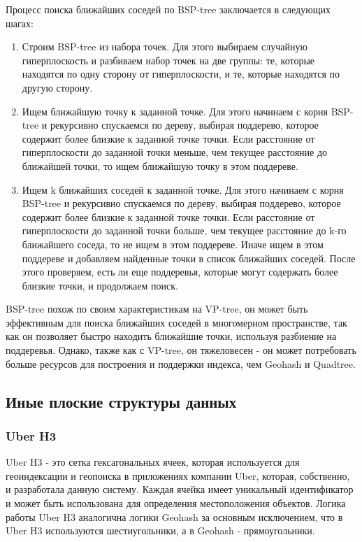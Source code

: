 Процесс поиска ближайших соседей по BSP-tree заключается в следующих шагах:
\begin{enumerate}
    \item Строим BSP-tree из набора точек. Для этого выбираем случайную гиперплоскость и разбиваем набор точек на две группы: те, которые находятся по одну сторону от гиперплоскости, и те, которые находятся по другую сторону.
    \item Ищем ближайшую точку к заданной точке. Для этого начинаем с корня BSP-tree и рекурсивно спускаемся по дереву, выбирая поддерево, которое содержит более близкие к заданной точке точки. Если расстояние от гиперплоскости до заданной точки меньше, чем текущее расстояние до ближайшей точки, то ищем ближайшую точку в этом поддереве.
    \item Ищем k ближайших соседей к заданной точке. Для этого начинаем с корня BSP-tree и рекурсивно спускаемся по дереву, выбирая поддерево, которое содержит более близкие к заданной точке точки. Если расстояние от гиперплоскости до заданной точки больше, чем текущее расстояние до k-го ближайшего соседа, то не ищем в этом поддереве. Иначе ищем в этом поддереве и добавляем найденные точки в список ближайших соседей. После этого проверяем, есть ли еще поддеревья, которые могут содержать более близкие точки, и продолжаем поиск.
\end{enumerate}

BSP-tree похож по своим характеристикам на VP-tree, он может быть эффективным для поиска ближайших соседей в многомерном пространстве, так как он позволяет быстро находить ближайшие точки, используя разбиение на поддеревья. Однако, также как с VP-tree, он тяжеловесен - он может потребовать больше ресурсов для построения и поддержки индекса, чем Geohash и Quadtree.

\subsection{Иные плоские структуры данных}
\subsubsection{Uber H3}
Uber H3 - это сетка гексагональных ячеек, которая используется для геоиндексации и геопоиска в приложениях компании Uber, которая, собственно, и разработала данную систему. Каждая ячейка имеет уникальный идентификатор и может быть использована для определения местоположения объектов. Логика работы Uber H3 аналогична логики Geohash за основным исключением, что в Uber H3 используются шестиугольники, а в Geohash - прямоугольники.

